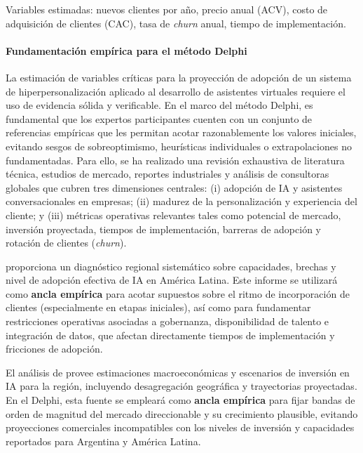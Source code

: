 Variables estimadas: nuevos clientes por año, precio anual (ACV), costo de adquisición de clientes (CAC), tasa de \textit{churn} anual, tiempo de implementación.


\paragraph{Fundamentación empírica para el método Delphi}

La estimación de variables críticas para la proyección de adopción de un sistema de hiperpersonalización aplicado al desarrollo de asistentes virtuales requiere el uso de evidencia sólida y verificable. En el marco del método Delphi, es fundamental que los expertos participantes cuenten con un conjunto de referencias empíricas que les permitan acotar razonablemente los valores iniciales, evitando sesgos de sobreoptimismo, heurísticas individuales o extrapolaciones no fundamentadas. Para ello, se ha realizado una revisión exhaustiva de literatura técnica, estudios de mercado, reportes industriales y análisis de consultoras globales que cubren tres dimensiones centrales: (i) adopción de IA y asistentes conversacionales en empresas; (ii) madurez de la personalización y experiencia del cliente; y (iii) métricas operativas relevantes tales como potencial de mercado, inversión proyectada, tiempos de implementación, barreras de adopción y rotación de clientes (\textit{churn}).

\textcite{ILIA2025} proporciona un diagnóstico regional sistemático sobre capacidades, brechas y nivel de adopción efectiva de IA en América Latina. Este informe se utilizará como \textbf{ancla empírica} para acotar supuestos sobre el ritmo de incorporación de clientes (especialmente en etapas iniciales), así como para fundamentar restricciones operativas asociadas a gobernanza, disponibilidad de talento e integración de datos, que afectan directamente tiempos de implementación y fricciones de adopción.

El análisis de \textcite{JungKatz2025ImpactoEconomicoIAALC} provee estimaciones macroeconómicas y escenarios de inversión en IA para la región, incluyendo desagregación geográfica y trayectorias proyectadas. En el Delphi, esta fuente se empleará como \textbf{ancla empírica} para fijar bandas de orden de magnitud del mercado direccionable y su crecimiento plausible, evitando proyecciones comerciales incompatibles con los niveles de inversión y capacidades reportados para Argentina y América Latina.

